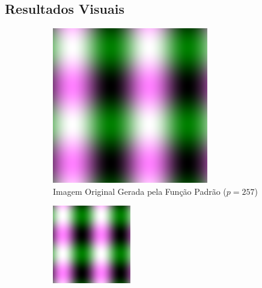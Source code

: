 \documentclass[12pt, a4paper]{article}
\begin{document}
\subsection{Resultados Visuais}

\begin{figure}[H]
    \centering
    \begin{subfigure}[b]{0.45\textwidth}
        \centering
        \includegraphics[width=\textwidth]{results/case_1/base_image.png}
        \caption{Imagem Original Gerada pela Função Padrão ($p=257$)}
        \label{fig:zoo_original_default}
    \end{subfigure}
    \hfill
    \begin{subfigure}[b]{0.45\textwidth}
        \centering
        \includegraphics[width=\textwidth]{results/case_1/compressed.png}

\end{subfigure}
\end{figure}
\end{document}
